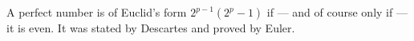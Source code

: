 A perfect number is of Euclid's form $2^{p-1}(2^p - 1)$ if --- and of course only if --- it is even. It was stated by Descartes and proved by Euler.
